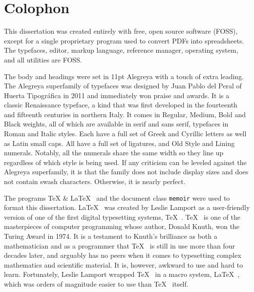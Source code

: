 
\chapter{Colophon}

This dissertation was created entirely with free, open source software (FOSS), except for a single proprietary program used to convert PDFs into spreadsheets. The typefaces, editor, markup language, reference manager, operating system, and all utilities are FOSS. 
\begin{center}
  \textbf{\qquad{}\qquad{}\qquad{}\qquad{}}
\end{center}
The body and headings were set in 11pt Alegreya with a touch of extra leading. The Alegreya superfamily of typefaces was designed by Juan Pablo del Peral of Huerta Tipográfica in 2011 and immediately won praise and awards. It is a classic Renaissance typeface, a kind that was first developed in the fourteenth and fifteenth centuries in northern Italy. It comes in Regular, Medium, Bold and Black weights, all of which are available in serif and sans serif, typefaces in Roman and Italic styles. Each have a full set of Greek and Cyrillic letters as well as Latin small caps. All have a full set of ligatures, and Old Style and Lining numerals. Notably, all the numerals share the same width so they line up regardless of which style is being used. If any criticism can be leveled against the Alegreya superfamily, it is that the family does not include display sizes and does not contain swash characters. Otherwise, it is nearly perfect.
\begin{center}
  \textbf{\quad\quad{}\quad\quad{}\quad\quad{}\quad\quad{}}
\end{center}
The programs \TeX{} \& \LaTeX{}  and the document class \texttt{memoir} were used to format this dissertation. \LaTeX  was created by Leslie Lamport as a user-friendly version of one of the first digital typesetting systems, \TeX . \TeX  is one of the masterpieces of computer programming whose author, Donald Knuth, won the Turing Award in 1974. It is a testament to Knuth's brilliance as both a mathematician and as a programmer that \TeX  is still in use more than four decades later, and arguably has no peers when it comes to typesetting complex mathematics and scientific material. It is, however, awkward to use and hard to learn. Fortunately, Leslie Lamport wrapped \TeX  in a macro system, \LaTeX , which was orders of magnitude easier to use than \TeX  itself.

